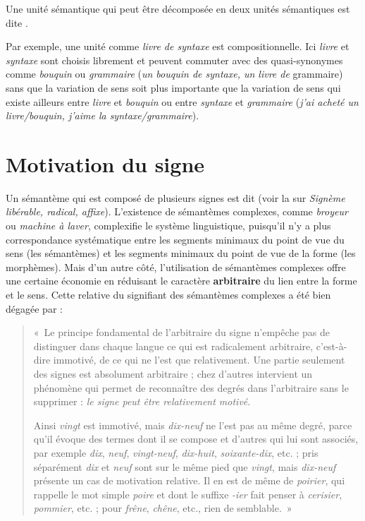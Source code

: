 {Une unité sémantique qui peut être décomposée en deux unités sémantiques est dite .}

Par exemple, une unité comme \textit{livre de syntaxe} est compositionnelle. Ici \textit{livre} et \textit{syntaxe} sont choisis librement et peuvent commuter avec des quasi-synonymes comme \textit{bouquin} ou \textit{grammaire} (\textit{un bouquin de syntaxe, un livre de} grammaire) sans que la variation de sens soit plus importante que la variation de sens qui existe ailleurs entre \textit{livre} et \textit{bouquin} ou entre \textit{syntaxe} et \textit{grammaire} (\textit{j’ai acheté un livre/bouquin, j’aime la syntaxe/grammaire}).

\section{Motivation du signe}\label{sec:2.3.2}

Un sémantème qui est composé de plusieurs signes est dit  (voir la  sur \textit{Signème libérable, radical, affixe}). L’existence de sémantèmes complexes, comme \textit{broyeur} ou \textit{machine à laver}, complexifie le système linguistique, puisqu’il n’y a plus correspondance systématique entre les segments minimaux du point de vue du sens (les sémantèmes) et les segments minimaux du point de vue de la forme (les morphèmes). Mais d’un autre côté, l’utilisation de sémantèmes complexes offre une certaine économie en réduisant le caractère \textbf{arbitraire} du lien entre la forme et le sens. Cette relative  du signifiant des sémantèmes complexes a été bien dégagée par \citet[180]{saussure1916cours} :

\begin{quote}
    «~Le principe fondamental de l’arbitraire du signe n’empêche pas de distinguer dans chaque langue ce qui est radicalement arbitraire, c’est-à-dire immotivé, de ce qui ne l’est que relativement. Une partie seulement des signes est absolument arbitraire ; chez d’autres intervient un phénomène qui permet de reconnaître des degrés dans l’arbitraire sans le supprimer : \textit{le signe peut être relativement motivé}.

Ainsi \textit{vingt} est immotivé, mais \textit{dix-neuf} ne l’est pas au même degré, parce qu’il évoque des termes dont il se compose et d’autres qui lui sont associés, par exemple \textit{dix}, \textit{neuf}, \textit{vingt-neuf}, \textit{dix-huit}, \textit{soixante-dix}, etc. ; pris séparément \textit{dix} et \textit{neuf} sont sur le même pied que \textit{vingt}, mais \textit{dix-neuf} présente un cas de motivation relative. Il en est de même de \textit{poirier}, qui rappelle le mot simple \textit{poire} et dont le suffixe \textit{{}-ier} fait penser à \textit{cerisier}, \textit{pommier}, etc. ; pour \textit{frêne}, \textit{chêne}, etc., rien de semblable.~»
\end{quote}

